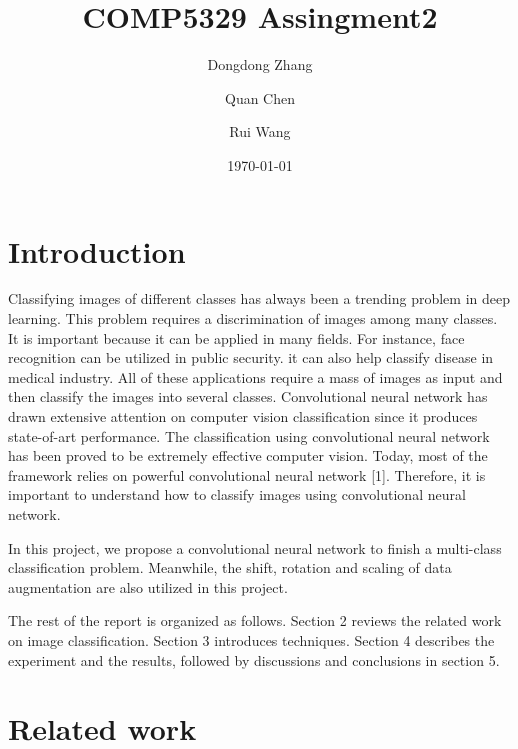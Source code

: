 \documentclass[twoside,twocolumn,10.8pt]{article}
\title{COMP5329 Assingment2} %
\author[1]{Dongdong Zhang}
\author[2]{Quan Chen}
\author[3]{Rui Wang}
\affil[1,2,3]{University of Sydney}
{	
    \makeatletter
    \renewcommand\AB@affilsepx{: \protect\Affilfont}
    \makeatother

    \affil[ ]{Student ID}

    \makeatletter
    \renewcommand\AB@affilsepx{, \protect\Affilfont}
    \makeatother

    \affil[1]{470161133}
    \affil[2]{470199228}
    \affil[3]{470208162}
}
\date{\today} %
\begin{document}
\maketitle


\section{Introduction}

\lettrine[nindent=0em,lines=3]{C}{}lassifying images of different classes has always been a trending problem in deep learning. This problem requires a discrimination of images among many classes. It is important because it can be applied in many fields. For instance, face recognition can be utilized in public security. it can also help classify disease in medical industry. All of these applications require a mass of images as input and then classify the images into several classes. Convolutional neural network has drawn extensive attention on computer vision classification since it produces state-of-art performance. The classification using convolutional neural network has been proved to be extremely effective computer vision. Today, most of the framework relies on powerful convolutional neural network [1]. Therefore, it is important to understand how to classify images using convolutional neural network. 


\noindent In this project, we propose a convolutional neural network to finish a multi-class classification problem. Meanwhile, the shift, rotation and scaling of data augmentation are also utilized in this project.

\noindent The rest of the report is organized as follows. Section 2 reviews the related work on image classification. Section 3 introduces techniques. Section 4 describes the experiment and the results, followed by discussions and conclusions in section 5.


\section{Related work}
\end{document}
